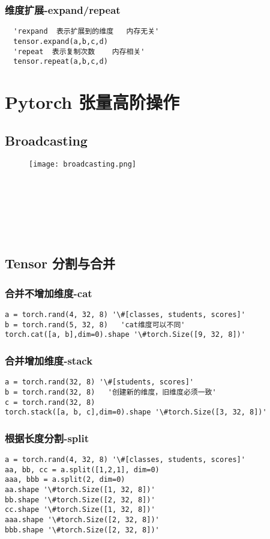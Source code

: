 \subsubsection{维度扩展-expand/repeat}
\begin{lstlisting}
  'rexpand  表示扩展到的维度   内存无关'
  tensor.expand(a,b,c,d)
  'repeat  表示复制次数    内存相关'
  tensor.repeat(a,b,c,d)
\end{lstlisting}




\newpage
\section{Pytorch 张量高阶操作}
\subsection{Broadcasting}
\begin{figure}[!h]
  \centering
  \texttt{[image: broadcasting.png]}
\end{figure}
~\\
~\\
~\\
~\\
~\\

\subsection{Tensor 分割与合并}
\subsubsection{合并不增加维度-cat}
\begin{lstlisting}
a = torch.rand(4, 32, 8) '\#[classes, students, scores]'
b = torch.rand(5, 32, 8)   'cat维度可以不同'
torch.cat([a, b],dim=0).shape '\#torch.Size([9, 32, 8])'
\end{lstlisting}

\subsubsection{合并增加维度-stack}
\begin{lstlisting}
a = torch.rand(32, 8) '\#[students, scores]'
b = torch.rand(32, 8)   '创建新的维度，旧维度必须一致'
c = torch.rand(32, 8)
torch.stack([a, b, c],dim=0).shape '\#torch.Size([3, 32, 8])'
\end{lstlisting}

\subsubsection{根据长度分割-split}
\begin{lstlisting}
a = torch.rand(4, 32, 8) '\#[classes, students, scores]'
aa, bb, cc = a.split([1,2,1], dim=0)
aaa, bbb = a.split(2, dim=0)
aa.shape '\#torch.Size([1, 32, 8])'
bb.shape '\#torch.Size([2, 32, 8])'
cc.shape '\#torch.Size([1, 32, 8])'
aaa.shape '\#torch.Size([2, 32, 8])'
bbb.shape '\#torch.Size([2, 32, 8])'
\end{lstlisting}

